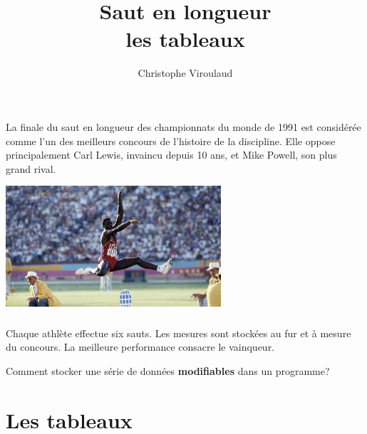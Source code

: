 \documentclass[svgnames,11pt]{beamer}
\author[]{Christophe Viroulaud}
\title{Saut en longueur\\les tableaux}
\date{\framebox{\textbf{DonRep 07}}}
\institute{Première - NSI}
\begin{document}
\begin{frame}
    \titlepage
\end{frame}
\begin{frame}
    \frametitle{}

    La finale du saut en longueur des championnats du monde de 1991 est considérée comme l'un des meilleurs concours de l'histoire de la discipline. Elle oppose principalement Carl Lewis, invaincu depuis 10 ans, et Mike Powell, son plus grand rival.
    \begin{center}
        \centering
        \includegraphics[width=8cm]{ressources/lewis.jpg}
        \label{IMG}
    \end{center}

\end{frame}
\begin{frame}
    \frametitle{}

    Chaque athlète effectue six sauts. Les mesures sont stockées au fur et à mesure du concours. La meilleure performance consacre le vainqueur.

    \begin{framed}\centering
        Comment stocker une série de données \textbf{modifiables} dans un programme?
    \end{framed}

\end{frame}
\section{Les tableaux}
\end{document}
